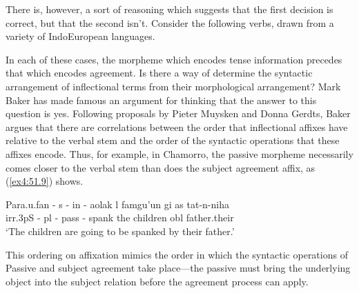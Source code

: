 There is, however, a sort of reasoning which suggests that the first decision is correct, but that the second isn't. Consider the following verbs, drawn from a variety of IndoEuropean languages.%
%
%
%
\begin{exe}
	\ex \label{ex4:51.8}
	\begin{xlist}
	\end{xlist}
\end{exe}
In each of these cases, the morpheme which encodes tense information precedes that which encodes agreement. Is there a way of determine the syntactic arrangement of inflectional terms from their morphological arrangement? Mark Baker has made famous an argument for thinking that the answer to this question is yes. Following proposals by Pieter Muysken and Donna Gerdts, Baker argues that there are correlations between the order that inflectional affixes have relative to the verbal stem and the order of the syntactic operations that these affixes encode. Thus, for example, in Chamorro, the passive morpheme necessarily comes closer to the verbal stem than does the subject agreement affix, as (\ref{ex4:51.9}) shows.
\begin{exe}
	\ex \label{ex4:51.9} \gll Para.u.fan - s - in - aolak l famgu'un {gi as} tat-n-niha\\ irr.3pS - pl - pass - spank the children obl father.their\\ `The children are going to be spanked by their father.'%
\end{exe}
This ordering on affixation mimics the order in which the syntactic operations of Passive and subject agreement take place---the passive must bring the underlying object into the subject relation before the agreement process can apply.

